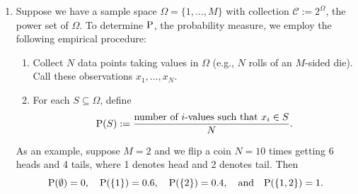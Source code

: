 \documentclass[12pt,twoside]{article}
\begin{document}
\begin{enumerate}
\begin{enumerate}
{\begin{enumerate}
\begin{enumerate}
\begin{itemize}
    \end{itemize}
    \end{enumerate}
\end{enumerate}

}

\item Suppose we have a sample space $\Omega=\{1,\ldots,M\}$ with
  collection $\mathcal{C}:=2^\Omega$, the power set of $\Omega$.
  To determine $\P$, the probability measure, we employ the following
  empirical procedure:
  \begin{enumerate}
  \item Collect $N$ data points taking values in $\Omega$ (e.g., $N$ rolls
    of an $M$-sided die).  Call these observations
    $x_1,\ldots,x_N$.
  \item For each $S\subseteq\Omega$, define
    $$\P(S) := \frac{\text{number of $i$-values such that $x_i\in S$}}{N}.$$
  \end{enumerate}
  As an example, suppose $M=2$ and we flip a coin $N=10$ times getting
  6 heads and 4 tails, where 1 denotes head and 2 denotes tail.  Then
  $$\P(\emptyset)=0,\quad \P(\{1\})=0.6,\quad \P(\{2\})=0.4,\quad\text{and}\quad \P(\{1,2\})=1.$$
  

\end{enumerate}
\end{enumerate}
\end{document}
